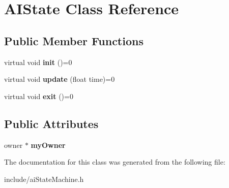 \hypertarget{classAIState}{
\section{\-A\-I\-State \-Class \-Reference}
\label{de/d71/classAIState}
}
\subsection*{\-Public \-Member \-Functions}
\begin{DoxyCompactItemize}
\item 
\hypertarget{classAIState_a56577dfe7787e4c77b7d48479f308bd0}{
virtual void {\bfseries init} ()=0}
\label{de/d71/classAIState_a56577dfe7787e4c77b7d48479f308bd0}

\item 
\hypertarget{classAIState_a039f3cbc82fef1d60c0ad3e13e6c5104}{
virtual void {\bfseries update} (float time)=0}
\label{de/d71/classAIState_a039f3cbc82fef1d60c0ad3e13e6c5104}

\item 
\hypertarget{classAIState_a1a54f3bcea5a45ccbc9abaa38a4b6f3f}{
virtual void {\bfseries exit} ()=0}
\label{de/d71/classAIState_a1a54f3bcea5a45ccbc9abaa38a4b6f3f}

\end{DoxyCompactItemize}
\subsection*{\-Public \-Attributes}
\begin{DoxyCompactItemize}
\item 
\hypertarget{classAIState_aab816d2cc034e529311eb029141cafc4}{
owner $\ast$ {\bfseries my\-Owner}}
\label{de/d71/classAIState_aab816d2cc034e529311eb029141cafc4}

\end{DoxyCompactItemize}


\-The documentation for this class was generated from the following file\-:\begin{DoxyCompactItemize}
\item 
include/ai\-State\-Machine.\-h\end{DoxyCompactItemize}
